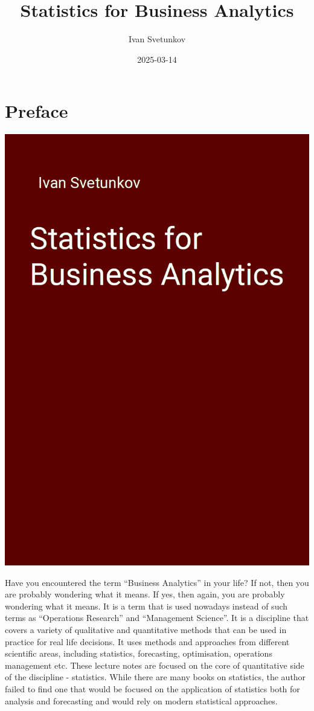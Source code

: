 \documentclass[
]{book}
\title{Statistics for Business Analytics}
\author{Ivan Svetunkov}
\date{2025-03-14}
\theoremstyle{definition}
\theoremstyle{definition}
\theoremstyle{definition}
\theoremstyle{definition}
\theoremstyle{remark}
\begin{document}
\maketitle

{
\setcounter{tocdepth}{1}
\tableofcontents
}
\chapter*{Preface}\label{preface}

\begin{center}\includegraphics[width=0.6\linewidth]{images/sba} \end{center}

Have you encountered the term ``Business Analytics'' in your life? If not, then you are probably wondering what it means. If yes, then again, you are probably wondering what it means. It is a term that is used nowadays instead of such terms as ``Operations Research'' and ``Management Science''. It is a discipline that covers a variety of qualitative and quantitative methods that can be used in practice for real life decisions. It uses methods and approaches from different scientific areas, including statistics, forecasting, optimisation, operations management etc. These lecture notes are focused on the core of quantitative side of the discipline - statistics. While there are many books on statistics, the author failed to find one that would be focused on the application of statistics both for analysis and forecasting and would rely on modern statistical approaches.
\end{document}
